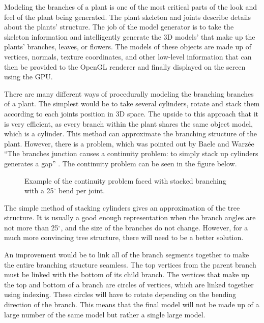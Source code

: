 Modeling the branches of a plant is one of the most critical parts of the look and feel of the plant being generated. The plant skeleton and joints describe details about the plants' structure. The job of the model generator is to take the skeleton information and intelligently generate the 3D models' that make up the plants' branches, leaves, or flowers. The models of these objects are made up of vertices, normals, texture coordinates, and other low-level information that can then be provided to the OpenGL renderer and finally displayed on the screen using the GPU.

There are many different ways of procedurally modeling the branching branches of a plant. The simplest would be to take several cylinders, rotate and stack them according to each joints position in 3D space. The upside to this approach that it is very efficient, as every branch within the plant shares the same object model, which is a cylinder. This method can approximate the branching structure of the plant. However, there is a problem, which was pointed out by Baele and Warz\'{e}e ``The branches junction causes a continuity problem: to simply stack up cylinders generates a gap'' \cite{baele2005real}. The continuity problem can be seen in the figure below.

\begin{figure}[htbp]
	{\centering
		\vspace{7px}
		\setlength{\fboxrule}{1pt}
		\caption{Example of the continuity problem faced with stacked branching with a 25$^{\circ}$ bend per joint.}
	}
\end{figure}

\FloatBarrier

\noindent
The simple method of stacking cylinders gives an approximation of the tree structure. It is usually a good enough representation when the branch angles are not more than 25$^{\circ}$, and the size of the branches do not change. However, for a much more convincing tree structure, there will need to be a better solution. 

An improvement would be to link all of the branch segments together to make the entire branching structure seamless. The top vertices from the parent branch must be linked with the bottom of its child branch. The vertices that make up the top and bottom of a branch are circles of vertices, which are linked together using indexing. These circles will have to rotate depending on the bending direction of the branch. This means that the final model will not be made up of a large number of the same model but rather a single large model. 

